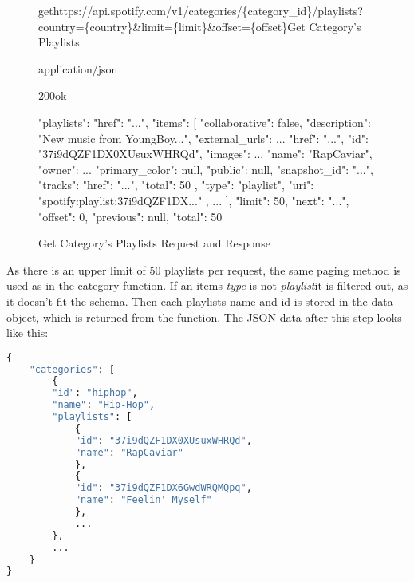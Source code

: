 \begin{figure}[H]
    \caption{Get Category's Playlists Request and Response}
	\label{fig:Get Category's Playlists Request and Response}
\begin{apiRoute}{get}{https://api.spotify.com/v1/categories/\{category\_id\}/playlists?country=\{country\}\&limit=\{limit\}\&offset=\{offset\}}{Get Category's Playlists}
    \begin{routeParameter}
    \end{routeParameter}
    \begin{routeResponse}{application/json}
        \begin{routeResponseItem}{200}{ok}
            \begin{routeResponseItemBody}
{
  "playlists": {
    "href": "...",
    "items": [
      {
        "collaborative": false,
        "description": "New music from YoungBoy...",
        "external_urls": ...
        "href": "...",
        "id": "37i9dQZF1DX0XUsuxWHRQd",
        "images": ...
        "name": "RapCaviar",
        "owner": ...
        "primary_color": null,
        "public": null,
        "snapshot_id": "...",
        "tracks": {
          "href": "...",
          "total": 50
        },
        "type": "playlist",
        "uri": "spotify:playlist:37i9dQZF1DX..."
      },
      ...
    ],
    "limit": 50,
    "next": "...",
    "offset": 0,
    "previous": null,
    "total": 50
  }
}
            \end{routeResponseItemBody}
        \end{routeResponseItem}
    \end{routeResponse}
\end{apiRoute}
\end{figure}

As there is an upper limit of 50 playlists per request, the same paging method is used as in the category function.
If an items \emph{type} is not \emph{playlist}it is filtered out, as it doesn't fit the schema.
Then each playlists name and id is stored in the data object, which is returned from the function.
The JSON data after this step looks like this:

\begin{lstlisting}[language=Python]
{
    "categories": [
        {
        "id": "hiphop",
        "name": "Hip-Hop",
        "playlists": [
            {
            "id": "37i9dQZF1DX0XUsuxWHRQd",
            "name": "RapCaviar"
            },
            {
            "id": "37i9dQZF1DX6GwdWRQMQpq",
            "name": "Feelin' Myself"
            },
            ...
        },
        ...
    }
}
\end{lstlisting}


